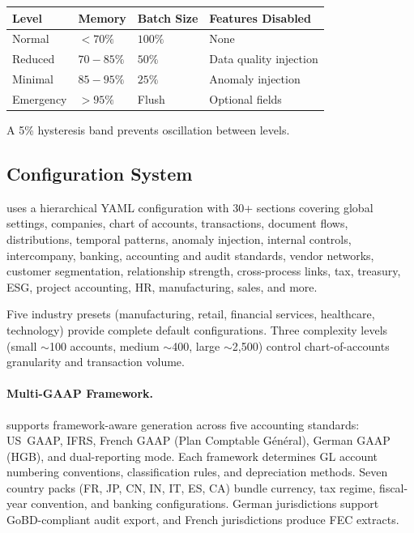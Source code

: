 \begin{center}
\begin{tabular}{llll}
\toprule
\textbf{Level} & \textbf{Memory} & \textbf{Batch Size}
  & \textbf{Features Disabled} \\
\midrule
Normal     & $<70\%$  & $100\%$ & None \\
Reduced    & $70{-}85\%$ & $50\%$  & Data quality injection \\
Minimal    & $85{-}95\%$ & $25\%$  & Anomaly injection \\
Emergency  & $>95\%$  & Flush   & Optional fields \\
\bottomrule
\end{tabular}
\end{center}

A 5\% hysteresis band prevents oscillation between levels.

\subsection{Configuration System}
\label{sec:arch_config}

\system{} uses a hierarchical YAML configuration with 30+ sections
covering global settings, companies, chart of accounts, transactions,
document flows, distributions, temporal patterns, anomaly injection,
internal controls, intercompany, banking, accounting and audit
standards, vendor networks, customer segmentation, relationship
strength, cross-process links, tax, treasury, ESG, project accounting,
HR, manufacturing, sales, and more.

Five industry presets (manufacturing, retail, financial services,
healthcare, technology) provide complete default configurations.
Three complexity levels (small $\sim$100 accounts, medium $\sim$400,
large $\sim$2{,}500) control chart-of-accounts granularity and
transaction volume.

\paragraph{Multi-GAAP Framework.}
\system{} supports framework-aware generation across five accounting
standards: US~GAAP, IFRS, French GAAP (Plan Comptable
G\'{e}n\'{e}ral), German GAAP (HGB), and dual-reporting mode.  Each
framework determines GL account numbering conventions, classification
rules, and depreciation methods.  Seven country packs (FR, JP, CN, IN,
IT, ES, CA) bundle currency, tax regime, fiscal-year convention, and
banking configurations.  German jurisdictions support GoBD-compliant
audit export, and French jurisdictions produce FEC extracts.


